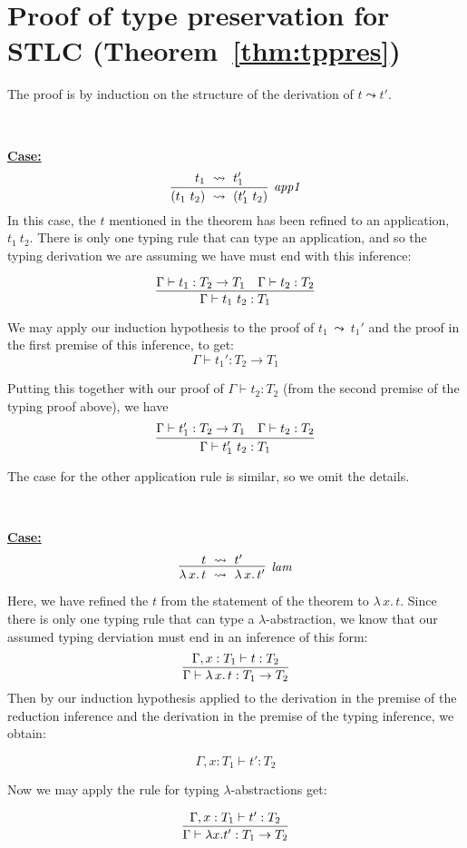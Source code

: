 \documentclass{article}
\providecommand{\lamrule}[0]{\infer[\textit{lam}]{\lambda\,x.\, t\ \leadsto\ \lambda\,x.\, t'}
                               {t\ \leadsto\ t'}}
\providecommand{\apparule}[0]{\infer[\textit{app1}]{(t_1\ t_2)\ \leadsto\ (t_1'\ t_2)}
                                {t_1\ \leadsto\ t_1'}}
\begin{document}


\appendix

\section{Proof of type preservation for STLC (Theorem~\ref{thm:tppres})}
\label{sec:tppres}

The proof is
  by induction on the structure of the derivation of $t \leadsto t'$.

\

\noindent \underline{\textbf{Case:}}
\[
\apparule
\]
\noindent In this case, the $t$ mentioned in the theorem has been
refined to an application, $t_1\ t_2$.  There is only one typing rule that
can type an application, and so the typing derivation we are assuming
we have must end with this inference:

\[
\infer{\Gamma \vdash t_1\ t_2 : T_1}
      {\Gamma \vdash t_1 : T_2 \to T_1 & \Gamma \vdash t_2 : T_2}
\]

\noindent We may apply our induction hypothesis to the proof of $t_1\
\leadsto\ t_1'$ and the proof in the first premise of this inference,
to get:
\[
\Gamma \vdash t_1' : T_2\to T_1
\]

\noindent Putting this together with our proof of $\Gamma \vdash t_2 : T_2$
(from the second premise of the typing proof above), we have
\[
\infer{\Gamma \vdash t_1'\ t_2: T_1}
{\Gamma \vdash t_1' : T_2\to T_1 & \Gamma \vdash t_2:T_2}
\]

\noindent The case for the other application rule is similar, so we omit the details.

\

\noindent \underline{\textbf{Case:}}
\[
\lamrule
\]

\noindent Here, we have refined the $t$ from the statement of the theorem
to $\lambda\,x.\, t$.  Since there is only one typing rule that can type
a $\lambda$-abstraction, we know that our assumed typing derviation must
end in an inference of this form:
\[
\infer{\Gamma\vdash \lambda\,x.\,t : T_1 \to T_2}
      {\Gamma,x:T_1\vdash t:T_2}
\]
\noindent Then by our induction hypothesis applied to the derivation in
the premise of the reduction inference and the derivation in the premise
of the typing inference, we obtain:

\[
\Gamma, x:T_1 \vdash t' : T_2
\]

\noindent Now we may apply the rule for typing $\lambda$-abstractions get:

\[
\infer{\Gamma \vdash \lambda x. t' : T_1 \to T_2}
{\Gamma, x:T_1 \vdash t' : T_2}
\]
\end{document}
